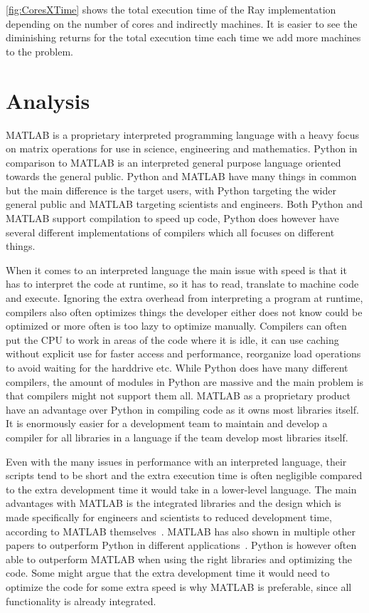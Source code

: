 \documentclass[12pt, a4paper]{article}
\begin{document}
\cref{fig:CoresXTime} shows the total execution time of the Ray implementation depending on the number of cores and indirectly machines.
It is easier to see the diminishing returns for the total execution time each time we add more machines to the problem.


\section{Analysis}

MATLAB is a proprietary interpreted programming language with a heavy focus on matrix operations for use in science, engineering and mathematics.
Python in comparison to MATLAB is an interpreted general purpose language oriented towards the general public.
Python and MATLAB have many things in common but the main difference is the target users, with Python targeting the wider general public and MATLAB targeting scientists and engineers.
Both Python and MATLAB support compilation to speed up code, Python does however have several different implementations of compilers which all focuses on different things.

When it comes to an interpreted language the main issue with speed is that it has to interpret the code at runtime, so it has to read, translate to machine code and execute.
Ignoring the extra overhead from interpreting a program at runtime, compilers also often optimizes things the developer either does not know could be optimized or more often is too lazy to optimize manually.
Compilers can often put the CPU to work in areas of the code where it is idle, it can use caching without explicit use for faster access and performance, reorganize load operations to avoid waiting for the harddrive etc. 
While Python does have many different compilers, the amount of modules in Python are massive and the main problem is that compilers might not support them all.
MATLAB as a proprietary product have an advantage over Python in compiling code as it owns most libraries itself.
It is enormously easier for a development team to maintain and develop a compiler for all libraries in a language if the team develop most libraries itself. 

Even with the many issues in performance with an interpreted language, their scripts tend to be short and the extra execution time is often negligible compared to the extra development time it would take in a lower-level language.
The main advantages with MATLAB is the integrated libraries and the design  which is made specifically for engineers and scientists to reduced development time, according to MATLAB themselves~\cite{WhyMatlab}. 
MATLAB has also shown in multiple other papers to outperform Python in different applications~\cite{EMMatVsPy, ARUOBA2015265}.
Python is however often able to outperform MATLAB when using the right libraries and optimizing the code.
Some might argue that the extra development time it would need to optimize the code for some extra speed is why MATLAB is preferable, since all functionality is already integrated.
\end{document}

